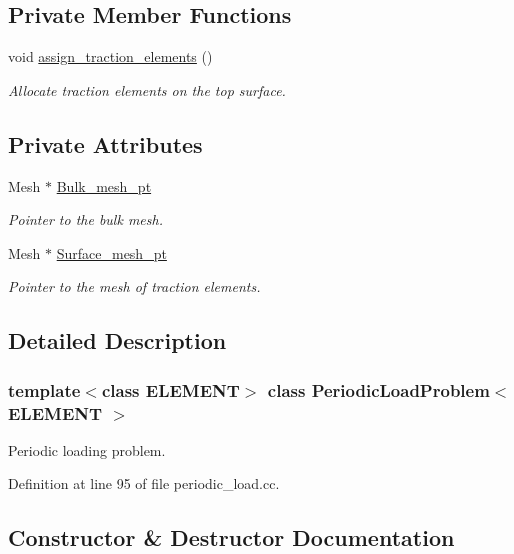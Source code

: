 \subsection*{Private Member Functions}
\begin{DoxyCompactItemize}
\item 
void \hyperlink{classPeriodicLoadProblem_ad850863c61c0055e230e6319d67905e2}{assign\+\_\+traction\+\_\+elements} ()
\begin{DoxyCompactList}\small\item\em Allocate traction elements on the top surface. \end{DoxyCompactList}\end{DoxyCompactItemize}
\subsection*{Private Attributes}
\begin{DoxyCompactItemize}
\item 
Mesh $\ast$ \hyperlink{classPeriodicLoadProblem_a120027bff23e2cd1f17f560c852533b6}{Bulk\+\_\+mesh\+\_\+pt}
\begin{DoxyCompactList}\small\item\em Pointer to the bulk mesh. \end{DoxyCompactList}\item 
Mesh $\ast$ \hyperlink{classPeriodicLoadProblem_a39b0b15487ae9aafc3d9e70b0e017325}{Surface\+\_\+mesh\+\_\+pt}
\begin{DoxyCompactList}\small\item\em Pointer to the mesh of traction elements. \end{DoxyCompactList}\end{DoxyCompactItemize}


\subsection{Detailed Description}
\subsubsection*{template$<$class E\+L\+E\+M\+E\+NT$>$\newline
class Periodic\+Load\+Problem$<$ E\+L\+E\+M\+E\+N\+T $>$}

Periodic loading problem. 

Definition at line 95 of file periodic\+\_\+load.\+cc.



\subsection{Constructor \& Destructor Documentation}
\mbox{\label{classPeriodicLoadProblem_a66bf36608f2068374c09c73d9256edda}} 

